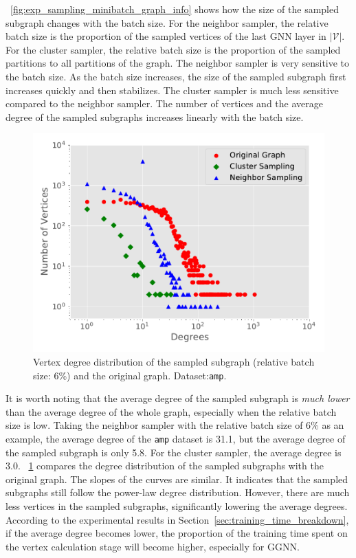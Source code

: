 \figurename~\ref{fig:exp_sampling_minibatch_graph_info} shows how the size of the sampled subgraph changes with the batch size.
For the neighbor sampler, the relative batch size is the proportion of the sampled vertices of the last GNN layer in $|\mathcal{V}|$.
For the cluster sampler, the relative batch size is the proportion of the sampled partitions to all partitions of the graph.
The neighbor sampler is very sensitive to the batch size.
As the batch size increases, the size of the sampled subgraph first increases quickly and then stabilizes.
The cluster sampler is much less sensitive compared to the neighbor sampler.
The number of vertices and the average degree of the sampled subgraphs increases linearly with the batch size.

\begin{figure}
    \centering
    \includegraphics[width=0.4\columnwidth]{figs/experiments/exp_sampling_minibatch_degrees_distribution_amazon-photo.pdf}
    \caption{Vertex degree distribution of the sampled subgraph (relative batch size: 6\%) and the original graph. Dataset:\texttt{amp}.}
    \label{fig:exp_sampling_minibatch_degrees_distribution}
\end{figure}

It is worth noting that the average degree of the sampled subgraph is \emph{much lower} than the average degree of the whole graph, especially when the relative batch size is low.
Taking the neighbor sampler with the relative batch size of 6\% as an example, the average degree of the \texttt{amp} dataset is 31.1, but the average degree of the sampled subgraph is only 5.8.
For the cluster sampler, the average degree is 3.0.
\figurename~\ref{fig:exp_sampling_minibatch_degrees_distribution} compares the degree distribution of the sampled subgraphs with the original graph.
The slopes of the curves are similar.
It indicates that the sampled subgraphs still follow the power-law degree distribution.
However, there are much less vertices in the sampled subgraphs, significantly lowering the average degrees.
According to the experimental results in Section~\ref{sec:training_time_breakdown}, if the average degree becomes lower, the proportion of the training time spent on the vertex calculation stage will become higher, especially for GGNN.

